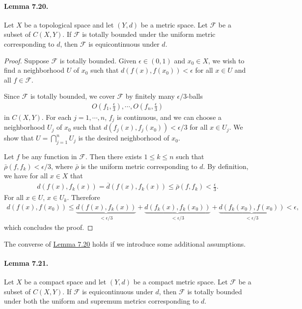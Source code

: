 \documentclass{article}
\numberwithin{equation}{section}
\theoremstyle{plain}
\theoremstyle{definition}
\begin{document}
\paragraph{Lemma 7.20.\label{lemma:7.20}} Let $X$ be a topological space and let $(Y,d)$ be a metric space. Let $\mathcal{F}$ be a subset of $C(X,Y)$. If $\mathcal{F}$ is totally bounded under the uniform metric corresponding to $d$, then $\mathcal{F}$ is equicontinuous under $d$.
\begin{proof}
Suppose $\mathcal{F}$ is totally bounded. Given $\epsilon\in (0,1)$ and $x_0\in X$, we wish to find a neighborhood $U$ of $x_0$ such that $d(f(x),f(x_0))<\epsilon$ for all $x\in U$ and all $f\in\mathcal{F}$.

Since $\mathcal{F}$ is totally bounded, we cover $\mathcal{F}$ by finitely many $\epsilon/3$-balls
\begin{align*}
	O\left(f_1,\frac{\epsilon}{3}\right),\cdots,O\left(f_n,\frac{\epsilon}{3}\right)
\end{align*}
in $C(X,Y)$. For each $j=1,\cdots,n$, $f_j$ is continuous, and we can choose a neighborhood $U_j$ of $x_0$ such that $d(f_j(x),f_j(x_0)) < \epsilon/3$ for all $x\in U_j$. We show that $U=\bigcap_{j=1}^n U_j$ is the desired neighborhood of $x_0$.

Let $f$ be any function in $\mathcal{F}$. Then there exists $1\leq k\leq n$ such that $\bar{\rho}\left(f,f_k\right)<\epsilon/3$, where $\bar{\rho}$ is the uniform metric corresponding to $d$. By definition, we have for all $x\in X$ that
\begin{align*}
	d\left(f(x),f_k(x)\right) = \overline{d}\left(f(x),f_k(x)\right) \leq \bar{\rho}\left(f,f_k\right) < \frac{\epsilon}{3}.
\end{align*}
For all $x\in U$,  $x\in U_k$. Therefore
\begin{align*}
	d\left(f(x),f(x_0)\right) \leq \underbrace{d\left(f(x),f_k(x)\right)}_{<\epsilon/3} + \underbrace{d\left(f_k(x),f_k(x_0)\right)}_{<\epsilon/3} + \underbrace{d\left(f_k(x_0),f(x_0)\right)}_{<\epsilon/3} < \epsilon,
\end{align*}
which concludes the proof.
\end{proof}

The converse of \hyperref[lemma:7.20]{Lemma 7.20} holds if we introduce some additional assumptions.

\paragraph{Lemma 7.21.\label{lemma:7.21}} Let $X$ be a compact space and let $(Y,d)$ be a compact metric space. Let $\mathcal{F}$ be a subset of $C(X,Y)$. If $\mathcal{F}$ is equicontinuous under $d$, then $\mathcal{F}$ is totally bounded under both the uniform and supremum metrics corresponding to $d$.
\end{document}
